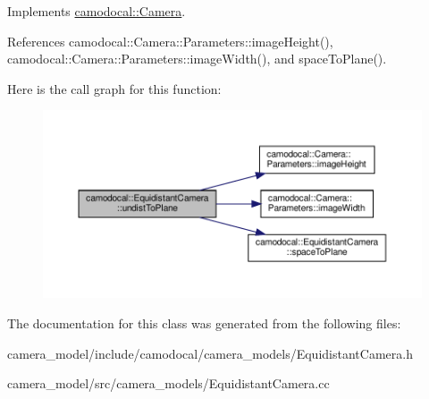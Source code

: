 Implements \hyperlink{classcamodocal_1_1Camera}{camodocal\+::\+Camera}.



References camodocal\+::\+Camera\+::\+Parameters\+::image\+Height(), camodocal\+::\+Camera\+::\+Parameters\+::image\+Width(), and space\+To\+Plane().

Here is the call graph for this function\+:\nopagebreak
\begin{figure}[H]
\begin{center}
\leavevmode
\includegraphics[width=350pt]{classcamodocal_1_1EquidistantCamera_ac0aae0a472fac59ad5fc22079eb5560d_cgraph}
\end{center}
\end{figure}


The documentation for this class was generated from the following files\+:\begin{DoxyCompactItemize}
\item 
camera\+\_\+model/include/camodocal/camera\+\_\+models/Equidistant\+Camera.\+h\item 
camera\+\_\+model/src/camera\+\_\+models/Equidistant\+Camera.\+cc\end{DoxyCompactItemize}
